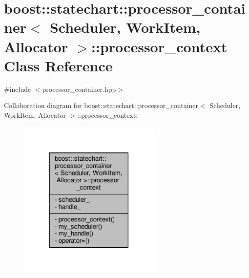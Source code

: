 \hypertarget{classboost_1_1statechart_1_1processor__container_1_1processor__context}{}\section{boost\+:\+:statechart\+:\+:processor\+\_\+container$<$ Scheduler, Work\+Item, Allocator $>$\+:\+:processor\+\_\+context Class Reference}
\label{classboost_1_1statechart_1_1processor__container_1_1processor__context}


{\ttfamily \#include $<$processor\+\_\+container.\+hpp$>$}



Collaboration diagram for boost\+:\+:statechart\+:\+:processor\+\_\+container$<$ Scheduler, Work\+Item, Allocator $>$\+:\+:processor\+\_\+context\+:
\nopagebreak
\begin{figure}[H]
\begin{center}
\leavevmode
\includegraphics[width=201pt]{classboost_1_1statechart_1_1processor__container_1_1processor__context__coll__graph}
\end{center}
\end{figure}
